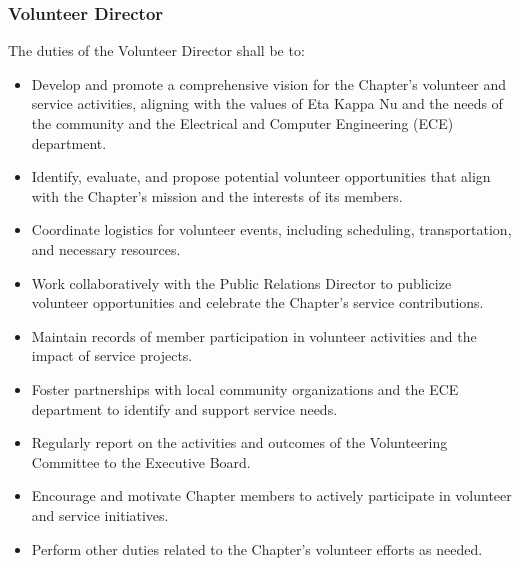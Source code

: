 \documentclass[10pt, oneside]{article}
\begin{document}
\subsubsection{Volunteer Director}
The duties of the Volunteer Director shall be to:
\begin{itemize}
    \item Develop and promote a comprehensive vision for the Chapter's volunteer and service activities, aligning with the values of Eta Kappa Nu and the needs of the community and the Electrical and Computer Engineering (ECE) department.
    \item Identify, evaluate, and propose potential volunteer opportunities that align with the Chapter's mission and the interests of its members.
    \item Coordinate logistics for volunteer events, including scheduling, transportation, and necessary resources.
    \item Work collaboratively with the Public Relations Director to publicize volunteer opportunities and celebrate the Chapter's service contributions.
    \item Maintain records of member participation in volunteer activities and the impact of service projects.
    \item Foster partnerships with local community organizations and the ECE department to identify and support service needs.
    \item Regularly report on the activities and outcomes of the Volunteering Committee to the Executive Board.
    \item Encourage and motivate Chapter members to actively participate in volunteer and service initiatives.
    \item Perform other duties related to the Chapter's volunteer efforts as needed.
\end{itemize}
\end{document}
